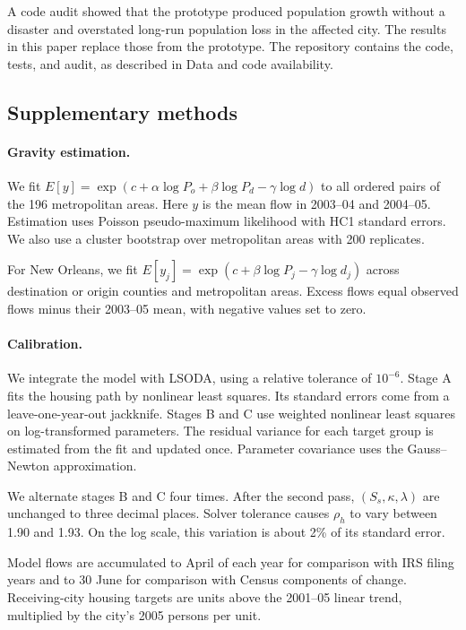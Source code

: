 \documentclass[11pt]{article}
\begin{document}
A code audit showed that the prototype produced population growth without a disaster and overstated long-run population loss in the affected city. The results in this paper replace those from the prototype. The repository contains the code, tests, and audit, as described in Data and code availability.

\subsection{Supplementary methods}\label{si:methods}
\paragraph{Gravity estimation.} We fit $E[y]=\exp(c+\alpha\log P_o+\beta\log P_d-\gamma\log d)$ to all ordered pairs of the 196 metropolitan areas. Here $y$ is the mean flow in 2003--04 and 2004--05. Estimation uses Poisson pseudo-maximum likelihood with HC1 standard errors. We also use a cluster bootstrap over metropolitan areas with 200 replicates.

For New Orleans, we fit $E[y_j]=\exp(c+\beta\log P_j-\gamma\log d_j)$ across destination or origin counties and metropolitan areas. Excess flows equal observed flows minus their 2003--05 mean, with negative values set to zero.

\paragraph{Calibration.} We integrate the model with LSODA, using a relative tolerance of $10^{-6}$. Stage A fits the housing path by nonlinear least squares. Its standard errors come from a leave-one-year-out jackknife. Stages B and C use weighted nonlinear least squares on log-transformed parameters. The residual variance for each target group is estimated from the fit and updated once. Parameter covariance uses the Gauss--Newton approximation.

We alternate stages B and C four times. After the second pass, $(S_s,\kappa,\lambda)$ are unchanged to three decimal places. Solver tolerance causes $\rho_h$ to vary between 1.90 and 1.93. On the log scale, this variation is about 2\% of its standard error.

Model flows are accumulated to April of each year for comparison with IRS filing years and to 30 June for comparison with Census components of change. Receiving-city housing targets are units above the 2001--05 linear trend, multiplied by the city's 2005 persons per unit.
\end{document}
